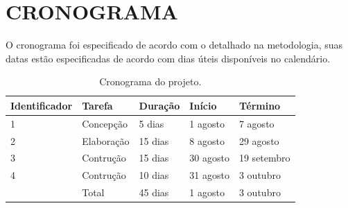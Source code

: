 \documentclass{article}
\begin{document}
\section{CRONOGRAMA}

O cronograma foi especificado de acordo com o detalhado na metodologia, suas datas estão especificadas de acordo com dias úteis disponíveis no calendário.


\begin{table}[!htbp]
                           \begin{center}
                \begin{tabular}{ | l | l | l | l | l |}
                \hline  
                \textbf{Identificador}& \textbf{Tarefa} &  \textbf{Duração} & \textbf{Início} & \textbf{Término} \\  \hline
                1 & Concepção & 5 dias & 1 agosto & 7 agosto \\  \hline
                2 & Elaboração & 15 dias & 8 agosto & 29 agosto \\  \hline
                3 & Contrução & 15 dias & 30 agosto & 19 setembro \\  \hline
                4 & Contrução & 10 dias & 31 agosto & 3 outubro \\ \hline
                  & Total & 45 dias & 1 agosto & 3 outubro \\
                \hline
                \end{tabular}
            \end{center}
               \caption{Cronograma do projeto. \label{fig:Cordova}}
\end{table}

\newpage 
\end{document}
